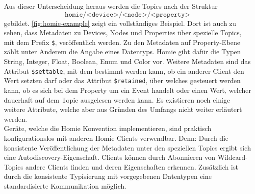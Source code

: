 Aus dieser Unterscheidung heraus werden die Topics nach der Struktur
\[\texttt{homie/<device>/<node>/<property>} \]
gebildet. \autoref{fig:homie-example} zeigt ein vollständiges Beispiel. Dort ist auch zu sehen, dass 
Metadaten zu Devices, Nodes und Properties über spezielle Topics, mit dem Prefix \texttt{\$},
veröffentlich werden. Zu den Metadaten auf Property-Ebene zählt unter Anderem die Angabe eines
Datentyps. Homie gibt dafür die Typen String, Integer, Float, Boolean, Enum und Color vor.
Weitere Metadaten sind das Attribut \texttt{\$settable}, mit dem bestimmt werden kann,
ob ein anderer Client den Wert setzten darf oder das Attribut \texttt{\$retained}, über 
welches gesteuert werden kann, ob es sich bei dem Property um ein Event handelt oder einen Wert,
welcher dauerhaft auf dem Topic ausgelesen werden kann. Es existieren noch einige weitere Attribute,
welche aber aus Gründen des Umfangs nicht weiter erläutert werden.\\
Geräte, welche die Homie Konvention implementieren, sind praktisch konfigurationslos mit anderen
Homie Clients verwendbar. Denn: Durch die konsistente Veröffentlichung der Metadaten unter 
den speziellen Topics ergibt sich eine Autodiscovery-Eigenschaft. Clients können durch Abonnieren
von Wildcard-Topics andere Clients finden und deren Eigenschaften erkennen. Zusätzlich ist durch die
konsistente Typisierung mit vorgegebenen Datentypen eine standardisierte Kommunikation möglich. 
